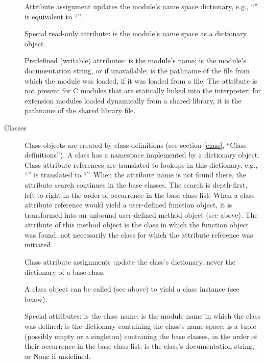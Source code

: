 \begin{description}
Attribute assignment updates the module's name space dictionary,
e.g., ``'' is equivalent to ``''.

Special read-only attribute:  is the module's name
space as a dictionary object.

Predefined (writable) attributes: 
is the module's name;  is the
module's documentation string, or
 if unavailable;  is the pathname of the
file from which the module was loaded, if it was loaded from a file.
The  attribute is not present for C{} modules that are
statically linked into the interpreter; for extension modules loaded
dynamically from a shared library, it is the pathname of the shared
library file.

\item[Classes]
Class objects are created by class definitions (see section
\ref{class}, ``Class definitions'').
A class has a namespace implemented by a dictionary object.
Class attribute references are translated to
lookups in this dictionary,
e.g., ``'' is translated to ``''.
When the attribute name is not found
there, the attribute search continues in the base classes.  The search
is depth-first, left-to-right in the order of occurrence in the
base class list.
When a class attribute reference would yield a user-defined function
object, it is transformed into an unbound user-defined method object
(see above).  The  attribute of this method object is the
class in which the function object was found, not necessarily the
class for which the attribute reference was initiated.

Class attribute assignments update the class's dictionary, never the
dictionary of a base class.

A class object can be called (see above) to yield a class instance (see
below).

Special attributes:  is the class name;
 is the module name in which the class was defined;
 is the dictionary containing the class's name space;
 is a tuple (possibly empty or a singleton)
containing the base classes, in the order of their occurrence in the
base class list;  is the class's documentation string,
or None if undefined.


\end{description}

